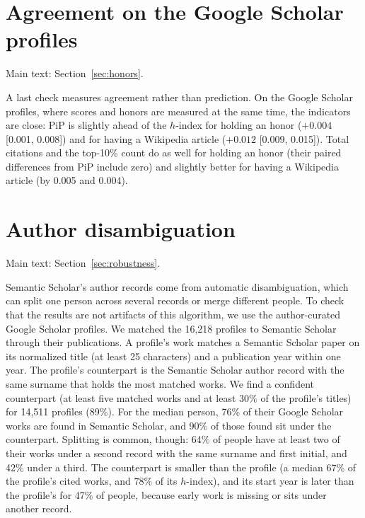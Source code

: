 \documentclass[11pt]{article}
\begin{document}
\section{Agreement on the Google Scholar profiles}
\label{supp:gsagree}
\noindent Main text: Section~\ref{sec:honors}.\par\nopagebreak

A last check measures agreement rather than prediction. On the Google Scholar profiles, where scores and honors are
measured at the same time, the indicators are close: PiP is slightly ahead of the $h$-index for holding an honor
($+0.004$ [0.001, 0.008]) and for having a Wikipedia article ($+0.012$ [0.009, 0.015]). Total citations and the
top-10\% count do as well for holding an honor (their paired differences from PiP include zero) and slightly better
for having a Wikipedia article (by 0.005 and 0.004).

\section{Author disambiguation}
\label{supp:disamb}
\noindent Main text: Section~\ref{sec:robustness}.\par\nopagebreak

Semantic Scholar's author records come from automatic disambiguation, which can split
one person across several records or merge different people. To check that the results are not artifacts of this
algorithm, we use the author-curated Google Scholar profiles. We matched the 16,218 profiles to Semantic Scholar through
their publications. A profile's work matches a Semantic Scholar paper on its normalized title (at least 25 characters)
and a publication year within one year. The profile's counterpart is the Semantic Scholar author record with the same
surname that holds the most matched works. We find a confident counterpart (at least five matched works and at least
30\% of the profile's titles) for 14,511 profiles (89\%). For the median person, 76\% of their Google Scholar works are
found in Semantic Scholar, and 90\% of those found sit under the counterpart. Splitting is common, though: 64\% of
people have at least two of their works under a second record with the same surname and first initial, and 42\% under a
third. The counterpart is smaller than the profile (a median 67\% of the profile's cited works, and 78\% of its
$h$-index), and its start year is later than the profile's for 47\% of people, because early work is missing or sits
under another record.
\end{document}
